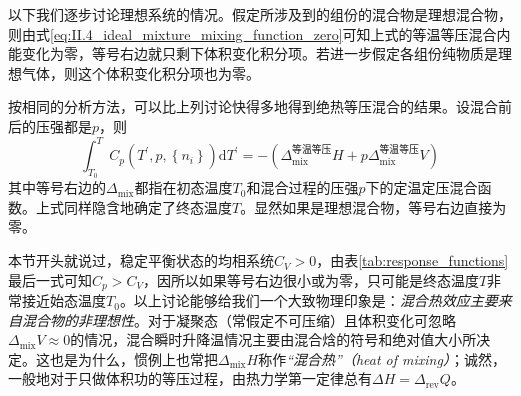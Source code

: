 \documentclass[main.tex]{subfiles}
\begin{document}
以下我们逐步讨论理想系统的情况。假定所涉及到的组份的混合物是理想混合物，则由式\eqref{eq:II.4_ideal_mixture_mixing_function_zero}可知上式的等温等压混合内能变化为零，等号右边就只剩下体积变化积分项。若进一步假定各组份纯物质是理想气体，则这个体积变化积分项也为零。

按相同的分析方法，可以比上列讨论快得多地得到绝热等压混合的结果。设混合前后的压强都是$p$，则
\[\int_{T_0}^TC_p\left(T^\prime,p,\left\{n_i\right\}\right)\mathrm{d}T^\prime=-\left(\Delta_\text{mix}^\text{等温等压}H+p\Delta_\text{mix}^\text{等温等压}V\right)\]
其中等号右边的$\Delta_\text{mix}$都指在初态温度$T_0$和混合过程的压强$p$下的定温定压混合函数。上式同样隐含地确定了终态温度$T$。显然如果是理想混合物，等号右边直接为零。

本节开头就说过，稳定平衡状态的均相系统$C_V>0$，由表\ref{tab:response_functions}最后一式可知$C_p>C_V$，因所以如果等号右边很小或为零，只可能是终态温度$T$非常接近始态温度$T_0$。以上讨论能够给我们一个大致物理印象是：\emph{混合热效应主要来自混合物的非理想性}。对于凝聚态（常假定不可压缩）且体积变化可忽略$\Delta_\text{mix}V\approx 0$的情况，混合瞬时升降温情况主要由混合焓的符号和绝对值大小所决定。这也是为什么，惯例上也常把$\Delta_\text{mix}H$称作\emph{“混合热”（heat of mixing）}；诚然，一般地对于只做体积功的等压过程，由热力学第一定律总有$\Delta H=\Delta_\text{rev}Q$。
\end{document}
